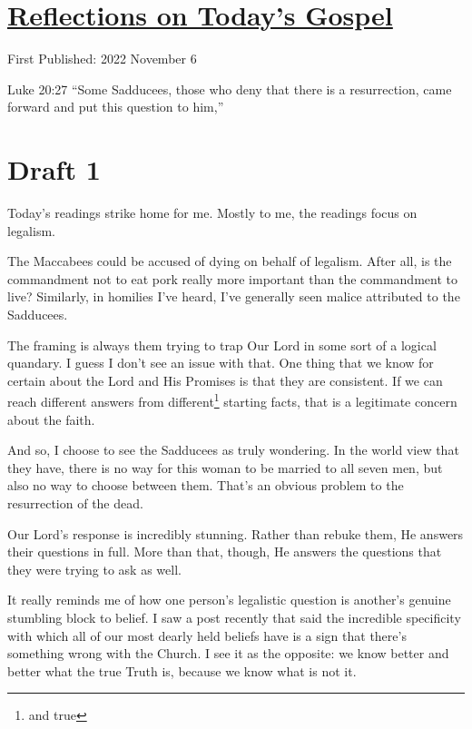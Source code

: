 \documentclass[12pt]{article}[titlepage]
\newcommand{\say}[1]{``#1''}
\newcommand{\1}{\={a}}
\newcommand{\2}{\={e}}
\newcommand{\3}{\={\i}}
\newcommand{\4}{\=o}
\newcommand{\5}{\=u}
\newcommand{\6}{\={A}}
\renewcommand{\,}{\textsuperscript{,}}
\begin{document}
\doublespacing
\section{\href{reflections-on-readings-32-ordinary-c-22.html}{Reflections on Today's Gospel}}
First Published: 2022 November 6

Luke 20:27 \say{Some Sadducees, those who deny that there is a resurrection, came forward and put this question to him,}

\section{Draft 1}
Today's readings strike home for me.
Mostly to me, the readings focus on legalism.

The Maccabees could be accused of dying on behalf of legalism.
After all, is the commandment not to eat pork really more important than the commandment to live?
Similarly, in homilies I've heard, I've generally seen malice attributed to the Sadducees.

The framing is always them trying to trap Our Lord in some sort of a logical quandary.
I guess I don't see an issue with that.
One thing that we know for certain about the Lord and His Promises is that they are consistent.
If we can reach different answers from different\footnote{and true} starting facts, that is a legitimate concern about the faith.

And so, I choose to see the Sadducees as truly wondering.
In the world view that they have, there is no way for this woman to be married to all seven men, but also no way to choose between them.
That's an obvious problem to the resurrection of the dead.

Our Lord's response is incredibly stunning.
Rather than rebuke them, He answers their questions in full.
More than that, though, He answers the questions that they were trying to ask as well.

It really reminds me of how one person's legalistic question is another's genuine stumbling block to belief.
I saw a post recently that said the incredible specificity with which all of our most dearly held beliefs have is a sign that there's something wrong with the Church.
I see it as the opposite: we know better and better what the true Truth is, because we know what is not it.
\end{document}
